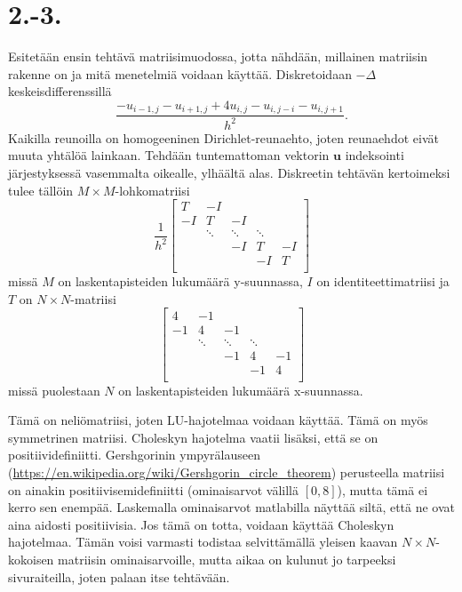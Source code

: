 \documentclass{article}
\title{}
\author{Mikael Myyrä}
\date{}
\begin{document}
\section*{2.-3.}

Esitetään ensin tehtävä matriisimuodossa, jotta nähdään, millainen matriisin
rakenne on ja mitä menetelmiä voidaan käyttää. Diskretoidaan
$-\Delta$ keskeisdifferenssillä
\[
  \frac{-u_{i-1,j} - u_{i+1,j} + 4u_{i,j} - u_{i,j-i} - u_{i,j+1}}{h^2}.
\]
Kaikilla reunoilla on homogeeninen Dirichlet-reunaehto, joten reunaehdot eivät
muuta yhtälöä lain\-kaan. Tehdään tuntemattoman vektorin $\mathbf{u}$
indeksointi järjestyksessä vasemmalta oikealle, ylhäältä alas. Diskreetin tehtävän
kertoimeksi tulee tällöin $M \times M$-lohkomatriisi
\[
  \frac{1}{h^2}
  \begin{bmatrix}
    T & -I \\
    -I & T & -I \\
       & \ddots & \ddots & \ddots \\
       & & -I & T & -I \\
       & & & -I & T \\
  \end{bmatrix}
\]
missä $M$ on laskentapisteiden lukumäärä y-suunnassa,
$I$ on identiteettimatriisi ja $T$ on $N \times N$-matriisi
\[
  \begin{bmatrix}
    4 & -1 \\
    -1 & 4 & -1 \\
       & \ddots & \ddots & \ddots \\
       & & -1 & 4 & -1 \\
       & & & -1 & 4 \\
  \end{bmatrix}
\]
missä puolestaan $N$ on laskentapisteiden lukumäärä x-suunnassa.

Tämä on neliömatriisi, joten LU-hajotelmaa voidaan käyttää. Tämä on myös
symmetrinen matriisi. Choleskyn hajotelma vaatii lisäksi, että se on
positiividefiniitti.  Gershgorinin ympyrälauseen
(\url{https://en.wikipedia.org/wiki/Gershgorin_circle_theorem}) perusteella
matriisi on ainakin positiivisemidefiniitti (ominaisarvot välillä $[0, 8]$),
mutta tämä ei kerro sen enempää. Laskemalla ominaisarvot matlabilla näyttää
siltä, että ne ovat aina aidosti positiivisia.  Jos tämä on totta, voidaan
käyttää Choleskyn hajotelmaa.  Tämän voisi varmasti todistaa selvittämällä
yleisen kaavan $N \times N$-kokoisen matriisin ominaisarvoille, mutta
aikaa on kulunut jo tarpeeksi sivuraiteilla, joten palaan itse tehtävään.
\end{document}

